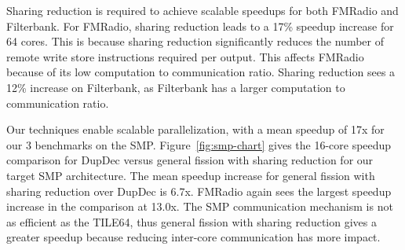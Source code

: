 Sharing reduction is required to achieve scalable speedups for both
FMRadio and Filterbank.  For FMRadio, sharing reduction leads to a
17\% speedup increase for 64 cores.  This is because sharing reduction
significantly reduces the number of remote write store instructions
required per output.  This affects FMRadio because of its low
computation to communication ratio.  Sharing reduction sees a 12\%
increase on Filterbank, as Filterbank has a larger computation to
communication ratio.


Our techniques enable scalable parallelization, with a mean speedup of
17x for our 3 benchmarks on the SMP.  Figure~\ref{fig:smp-chart} gives
the 16-core speedup comparison for DupDec versus general fission with
sharing reduction for our target SMP architecture.  The mean speedup
increase for general fission with sharing reduction over DupDec is
6.7x.  FMRadio again sees the largest speedup increase in the
comparison at 13.0x.  The SMP communication mechanism is not as
efficient as the TILE64, thus general fission with sharing reduction
gives a greater speedup because reducing inter-core communication has
more impact.
